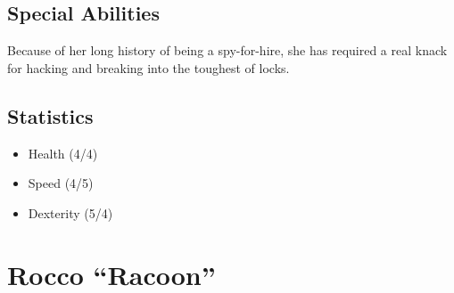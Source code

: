 \documentclass[10pt]{report}
\begin{document}
\begin{multicols}{2}
    \subsection{Special Abilities}
    
    Because of her long history of being a spy-for-hire, she has required a real knack for hacking and breaking into the toughest of locks.

    \subsection{Statistics}
    
    \begin{itemize}
        \item Health (4/4)
        \item Speed (4/5)
        \item Dexterity (5/4)
    \end{itemize}
\end{multicols}

\pagebreak

\section{Rocco ``Racoon''}
\end{document}
